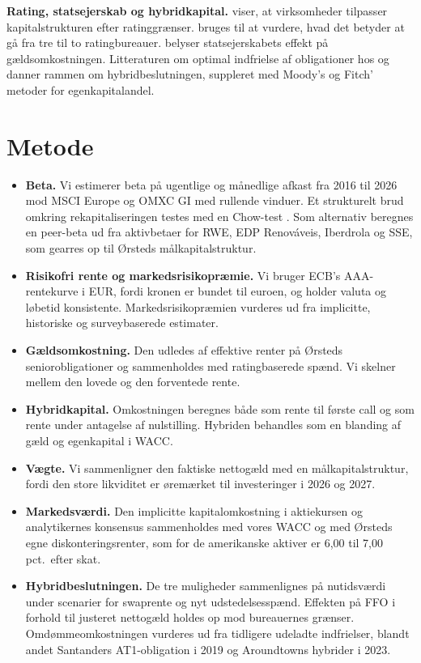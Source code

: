 \documentclass[11pt,a4paper]{article}
\begin{document}
\textbf{Rating, statsejerskab og hybridkapital.} \citet{kisgen2006} viser, at virksomheder tilpasser kapitalstrukturen efter ratinggrænser. \citet{bongaerts2012} bruges til at vurdere, hvad det betyder at gå fra tre til to ratingbureauer. \citet{borisova2011} belyser statsejerskabets effekt på gældsomkostningen. Litteraturen om optimal indfrielse af obligationer hos \citet{longstaff1994} og \citet{king2000} danner rammen om hybridbeslutningen, suppleret med Moody's og Fitch' metoder for egenkapitalandel.

\section{Metode}

\begin{itemize}
  \item \textbf{Beta.} Vi estimerer beta på ugentlige og månedlige afkast fra 2016 til 2026 mod MSCI Europe og OMXC GI med rullende vinduer. Et strukturelt brud omkring rekapitaliseringen testes med en Chow-test \citep{chow1960}. Som alternativ beregnes en peer-beta ud fra aktivbetaer for RWE, EDP Renováveis, Iberdrola og SSE, som gearres op til Ørsteds målkapitalstruktur.
  \item \textbf{Risikofri rente og markedsrisikopræmie.} Vi bruger ECB's AAA-rentekurve i EUR, fordi kronen er bundet til euroen, og holder valuta og løbetid konsistente. Markedsrisikopræmien vurderes ud fra implicitte, historiske og surveybaserede estimater.
  \item \textbf{Gældsomkostning.} Den udledes af effektive renter på Ørsteds seniorobligationer og sammenholdes med ratingbaserede spænd. Vi skelner mellem den lovede og den forventede rente.
  \item \textbf{Hybridkapital.} Omkostningen beregnes både som rente til første call og som rente under antagelse af nulstilling. Hybriden behandles som en blanding af gæld og egenkapital i WACC.
  \item \textbf{Vægte.} Vi sammenligner den faktiske nettogæld med en målkapitalstruktur, fordi den store likviditet er øremærket til investeringer i 2026 og 2027.
  \item \textbf{Markedsværdi.} Den implicitte kapitalomkostning i aktiekursen og analytikernes konsensus sammenholdes med vores WACC og med Ørsteds egne diskonteringsrenter, som for de amerikanske aktiver er 6,00 til 7,00 pct.\ efter skat.
  \item \textbf{Hybridbeslutningen.} De tre muligheder sammenlignes på nutidsværdi under scenarier for swaprente og nyt udstedelsesspænd. Effekten på FFO i forhold til justeret nettogæld holdes op mod bureauernes grænser. Omdømmeomkostningen vurderes ud fra tidligere udeladte indfrielser, blandt andet Santanders AT1-obligation i 2019 og Aroundtowns hybrider i 2023.
\end{itemize}
\end{document}
